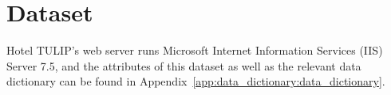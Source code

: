 \section{Dataset}

Hotel TULIP's web server runs Microsoft Internet Information Services (IIS) Server 7.5, and the attributes of this dataset as well as the relevant data dictionary can be found in Appendix~\ref{app:data_dictionary:data_dictionary}.